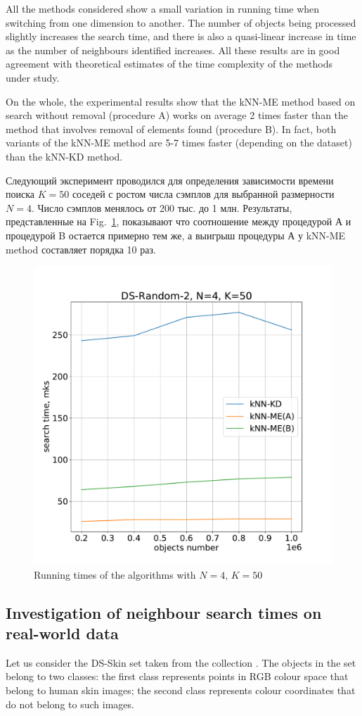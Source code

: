 \documentclass[entropy,article,submit,moreauthors,pdftex]{Definitions/mdpi}
\begin{document}
\begin{paracol}{2}
All the methods considered show a small variation in running time when switching from one dimension to another. The number of objects being processed slightly increases the search time, and there is also a quasi-linear increase in time as the number of neighbours identified increases. All these results are in good agreement with theoretical estimates of the time complexity of the methods under study.

On the whole, the experimental results show that the kNN-ME method based on search without removal (procedure A) works on average 2 times faster than the method that involves removal of elements found (procedure B). In fact, both variants of the kNN-ME method are 5-7 times faster (depending on the dataset) than the kNN-KD method.

Следующий эксперимент проводился для определения зависимости времени поиска $K = 50$ соседей с ростом числа сэмплов для выбранной размерности $N = 4$. Число сэмплов менялось от 200 тыс. до 1 млн. Результаты, представленные на Fig.~\ref{figN}, показывают что соотношение между процедурой А и процедурой B остается примерно тем же, а выигрыш процедуры А у kNN-ME method составляет порядка 10 раз.

\begin{figure}
\widefigure
\includegraphics[width=0.5\linewidth]{figN.pdf}
\caption{Running times of the algorithms with $N = 4$, $K = 50$\label{figN}}
\end{figure}  


\subsection{Investigation of neighbour search times on real-world data}\label{RealData}

Let us consider the DS-Skin set taken from the collection \cite{ds-1}. The objects in the set belong to two classes: the first class represents points in RGB colour space that belong to human skin images; the second class represents colour coordinates that do not belong to such images.


\end{paracol}
\end{document}
